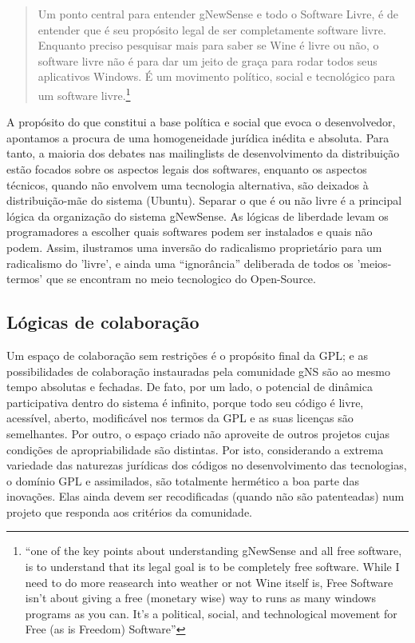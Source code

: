 \begin{quote}
Um ponto central para entender gNewSense e todo o Software Livre, é de entender que é seu propósito legal de ser completamente software livre. Enquanto preciso pesquisar mais para saber se Wine é livre ou não, o software livre não é para dar um jeito de graça para rodar todos seus aplicativos Windows. É um movimento político, social e tecnológico para um software livre.\footnote{“one of the key points about understanding gNewSense and all free software, is to understand that its legal goal is to be completely free software. While I need to do more reasearch into weather or not Wine itself is, Free Software isn't about  giving a free (monetary wise) way to runs as many windows programs as you can. It's a political, social, and technological movement for Free (as is Freedom) Software”}
\end{quote}

A propósito do que constitui a base política e social que evoca o desenvolvedor, apontamos a procura de uma homogeneidade jurídica inédita e absoluta. Para tanto, a maioria dos debates nas mailinglists de desenvolvimento da distribuição estão focados sobre os aspectos legais dos softwares, enquanto os aspectos técnicos, quando não envolvem uma tecnologia alternativa, são deixados à distribuição-mãe do sistema (Ubuntu). Separar o que é ou não livre é a principal lógica da organização do sistema gNewSense. As lógicas de liberdade levam os programadores a escolher quais softwares podem ser instalados e quais não podem. Assim, ilustramos uma inversão do radicalismo proprietário para um radicalismo do 'livre', e ainda uma “ignorância” deliberada de todos os 'meios-termos' que se encontram no meio tecnologico do Open-Source.

\subsection{Lógicas de colaboração} \label{3.2.4}

Um espaço de colaboração sem restrições é o propósito final da GPL; e as possibilidades de colaboração instauradas pela comunidade gNS são ao mesmo tempo absolutas e fechadas. De fato, por um lado, o potencial de dinâmica participativa dentro do sistema é infinito, porque todo seu código é livre, acessível, aberto, modificável nos termos da GPL e as suas licenças são semelhantes. Por outro, o espaço criado n\~ao aproveite de outros projetos cujas condições de apropriabilidade são distintas. Por isto, considerando a extrema variedade das naturezas jurídicas dos códigos no desenvolvimento das tecnologias, o domínio GPL e assimilados, são totalmente hermético a boa parte das inovações. Elas ainda devem ser recodificadas (quando não são patenteadas) num projeto que responda aos critérios da comunidade.

